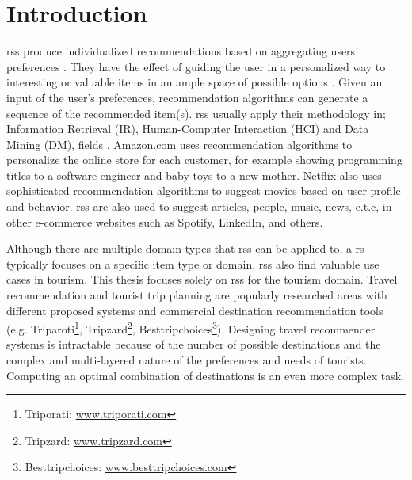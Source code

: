 

\chapter{Introduction}\label{chapter:introduction}
\Glspl{rs} produce individualized recommendations based on aggregating users' preferences \parencite{Ricci2011IntroductionHandbook}. They have the effect of guiding the user in a personalized way to interesting
or valuable items in an ample space of possible options \parencite{Burke2002HybridInteraction}. Given an input of the user's preferences, recommendation algorithms can generate a sequence of the recommended item(s).  \Glspl{rs} usually
apply their methodology in; Information Retrieval (IR), Human-Computer Interaction (HCI) and Data Mining (DM), fields \parencite{Ricci2011IntroductionHandbook}. Amazon.com \parencite{Linden2003Amazon.comFiltering} uses recommendation algorithms to personalize the online store for each customer, for example showing programming titles to a software engineer and baby toys to a new mother.  Netflix \parencite{Amatriain2013BigRecommendations} also uses sophisticated recommendation algorithms to suggest movies based on user profile and behavior. \Glspl{rs} are also used to suggest articles, people, music, news, e.t.c, in other e-commerce websites such as Spotify, LinkedIn, and others.

Although there are multiple domain types that \glspl{rs} can be applied to, a \gls{rs} typically focuses on a specific item type or domain. \Glspl{rs} also find valuable use cases in tourism. This thesis focuses solely on \glspl{rs} for the tourism domain. Travel recommendation and tourist trip planning are popularly researched areas with different proposed systems \parencite{wolfgang_umap_recsystem, cbrecsys2014, Thiengburanathum2018AnTourists, Arif2020Blockchain-BasedSystem, Alrasheed2020ASystem} and commercial destination recommendation tools (e.g. Triparoti\footnote{Triporati: \url{www.triporati.com}}, Tripzard\footnote{Tripzard: \url{www.tripzard.com}}, Besttripchoices\footnote{Besttripchoices: \url{www.besttripchoices.com}}).
Designing travel recommender systems is intractable because of the number of possible destinations and the complex
and multi-layered nature of the preferences and needs of tourists. Computing an optimal combination of destinations is an even more complex task. 

